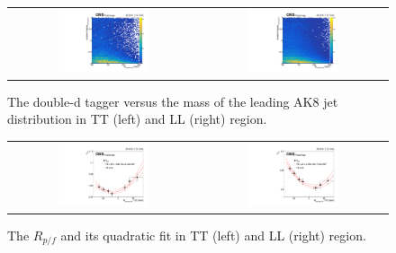   
  
  \begin{figure}[t]
  \centering
  \begin{tabular}{cc}
    \includegraphics[width=0.5\textwidth]{Figures/al/2d_TT.pdf} &
   \includegraphics[width=0.5\textwidth]{Figures/al/2d_LL.pdf} 
  \end{tabular}
  \caption{The double-d tagger versus the mass of the leading AK8 jet distribution in TT (left) and LL (right) region.}
  \label{fig:2dfig}
\end{figure}


\begin{figure}[t]
  \centering
 \begin{tabular}{cc}
    \includegraphics[width=0.5\textwidth]{Figures/al/1d_TT.pdf} &
   \includegraphics[width=0.5\textwidth]{Figures/al/1d_LL.pdf} 
   
  \end{tabular}
  \caption{The $R_{p/f}$ and its quadratic fit in TT (left) and LL (right) region.}
  \label{fig:44}
\end{figure}



